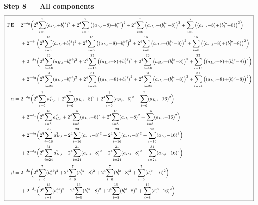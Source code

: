 \documentclass[fleqn]{article}
\begin{document}
\textbf{Step 8 --- All components}
{\setlength{\mathindent}{0em}
\[
\small
\boxed{\;
\begin{aligned}
\mathrm{PE} ={}& 2^{-\delta_0}\Big(2^{8}\!\sum_{i=0}^{7}(a_{H,i}{+}b_i^{hi})^2 + 2^{4}\!\sum_{i=0}^{7}\big((a_{L,i}{-}8){+}b_i^{hi}\big)^2 + 2^{4}\!\sum_{i=0}^{7}\big(a_{H,i}{+}(b_i^{lo}{-}8)\big)^2 + \sum_{i=0}^{7}\big((a_{L,i}{-}8){+}(b_i^{lo}{-}8)\big)^2\Big) \\
  & + 2^{-\delta_1}\Big(2^{8}\!\sum_{i=8}^{15}(a_{H,i}{+}b_i^{hi})^2 + 2^{4}\!\sum_{i=8}^{15}\big((a_{L,i}{-}8){+}b_i^{hi}\big)^2 + 2^{4}\!\sum_{i=8}^{15}\big(a_{H,i}{+}(b_i^{lo}{-}8)\big)^2 + \sum_{i=8}^{15}\big((a_{L,i}{-}8){+}(b_i^{lo}{-}8)\big)^2\Big) \\
  & + 2^{-\delta_2}\Big(2^{8}\!\sum_{i=16}^{23}(a_{H,i}{+}b_i^{hi})^2 + 2^{4}\!\sum_{i=16}^{23}\big((a_{L,i}{-}8){+}b_i^{hi}\big)^2 + 2^{4}\!\sum_{i=16}^{23}\big(a_{H,i}{+}(b_i^{lo}{-}8)\big)^2 + \sum_{i=16}^{23}\big((a_{L,i}{-}8){+}(b_i^{lo}{-}8)\big)^2\Big) \\
  & + 2^{-\delta_3}\Big(2^{8}\!\sum_{i=24}^{31}(a_{H,i}{+}b_i^{hi})^2 + 2^{4}\!\sum_{i=24}^{31}\big((a_{L,i}{-}8){+}b_i^{hi}\big)^2 + 2^{4}\!\sum_{i=24}^{31}\big(a_{H,i}{+}(b_i^{lo}{-}8)\big)^2 + \sum_{i=24}^{31}\big((a_{L,i}{-}8){+}(b_i^{lo}{-}8)\big)^2\Big) \\[0.3em]
\alpha ={}& 2^{-\delta_0}\Big(2^{8}\!\sum_{i=0}^{7}a_{H,i}^2 + 2^{4}\!\sum_{i=0}^{7}(a_{L,i}{-}8)^2 + 2^{4}\!\sum_{i=0}^{7}(a_{H,i}{-}8)^2 + \sum_{i=0}^{7}(a_{L,i}{-}16)^2\Big) \\
  & + 2^{-\delta_1}\Big(2^{8}\!\sum_{i=8}^{15}a_{H,i}^2 + 2^{4}\!\sum_{i=8}^{15}(a_{L,i}{-}8)^2 + 2^{4}\!\sum_{i=8}^{15}(a_{H,i}{-}8)^2 + \sum_{i=8}^{15}(a_{L,i}{-}16)^2\Big) \\
  & + 2^{-\delta_2}\Big(2^{8}\!\sum_{i=16}^{23}a_{H,i}^2 + 2^{4}\!\sum_{i=16}^{23}(a_{L,i}{-}8)^2 + 2^{4}\!\sum_{i=16}^{23}(a_{H,i}{-}8)^2 + \sum_{i=16}^{23}(a_{L,i}{-}16)^2\Big) \\
  & + 2^{-\delta_3}\Big(2^{8}\!\sum_{i=24}^{31}a_{H,i}^2 + 2^{4}\!\sum_{i=24}^{31}(a_{L,i}{-}8)^2 + 2^{4}\!\sum_{i=24}^{31}(a_{H,i}{-}8)^2 + \sum_{i=24}^{31}(a_{L,i}{-}16)^2\Big) \\[0.3em]
\beta ={}& 2^{-\delta_0}\Big(2^{8}\!\sum_{i=0}^{7}(b_i^{hi})^2 + 2^{4}\!\sum_{i=0}^{7}(b_i^{hi}{-}8)^2 + 2^{4}\!\sum_{i=0}^{7}(b_i^{lo}{-}8)^2 + \sum_{i=0}^{7}(b_i^{lo}{-}16)^2\Big) \\
  & + 2^{-\delta_1}\Big(2^{8}\!\sum_{i=8}^{15}(b_i^{hi})^2 + 2^{4}\!\sum_{i=8}^{15}(b_i^{hi}{-}8)^2 + 2^{4}\!\sum_{i=8}^{15}(b_i^{lo}{-}8)^2 + \sum_{i=8}^{15}(b_i^{lo}{-}16)^2\Big) \\

\end{aligned}}\]}
\end{document}
